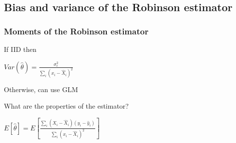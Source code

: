 
\subsection{Bias and variance of the Robinson estimator}

\subsubsection{Moments of the Robinson estimator}

If IID then

\(Var (\hat \theta) =\frac{\sigma^2_\epsilon }{\sum_i(x_i-\hat X_i)^2}\)

Otherwise, can use GLM

What are the properties of the estimator?

\(E[\hat \theta ]=E[\frac{\sum_i (X_i-\hat X_i)(y_i-\hat y_i)}{\sum_i(x_i-\hat X_i)^2}]\)


